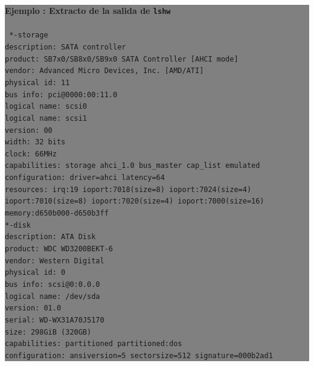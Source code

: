 \documentclass[12pt]{article}
\begin{document}
\colorbox{grey}{\parbox[t]{0.95\linewidth}{ \vspace*{0.5cm} { 
{\bf Ejemplo : Extracto de la salida de \texttt{lshw}}
\\ \\
{\tt \scriptsize
        *-storage\\
             description: SATA controller\\
             product: SB7x0/SB8x0/SB9x0 SATA Controller [AHCI mode]\\
             vendor: Advanced Micro Devices, Inc. [AMD/ATI]\\
             physical id: 11\\
             bus info: pci@0000:00:11.0\\
             logical name: scsi0\\
             logical name: scsi1\\
             version: 00\\
             width: 32 bits\\
             clock: 66MHz\\
             capabilities: storage ahci\_1.0 bus\_master cap\_list emulated\\
             configuration: driver=ahci latency=64\\
             resources: irq:19 ioport:7018(size=8) ioport:7024(size=4) ioport:7010(size=8) ioport:7020(size=4) ioport:7000(size=16) memory:d650b000-d650b3ff\\
           *-disk\\
                description: ATA Disk\\
                product: WDC WD3200BEKT-6\\
                vendor: Western Digital\\
                physical id: 0\\
                bus info: scsi@0:0.0.0\\
                logical name: /dev/sda\\
                version: 01.0\\
                serial: WD-WX31A70J5170\\
                size: 298GiB (320GB)\\
                capabilities: partitioned partitioned:dos\\
                configuration: ansiversion=5 sectorsize=512 signature=000b2ad1\\
}
} \vspace*{0.5cm} } } 
\end{document}
